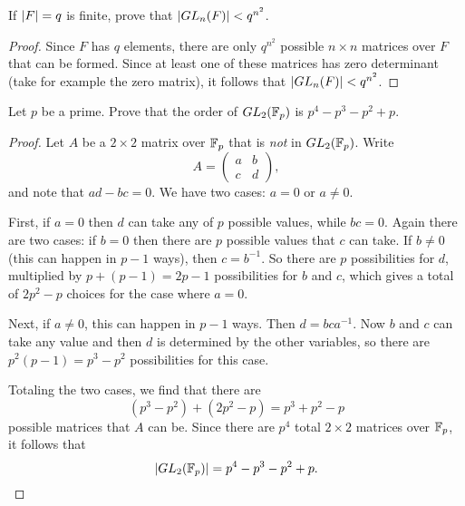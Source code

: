  If $\lvert{F}\rvert = q$ is finite, prove that
$\lvert{GL_n(F)}\rvert < q^{n^2}$.
\begin{proof}
  Since $F$ has $q$ elements, there are only $q^{n^2}$ possible
  $n\times n$ matrices over $F$ that can be formed. Since at least one
  of these matrices has zero determinant (take for example the zero
  matrix), it follows that $\lvert{GL_n(F)}\rvert < q^{n^2}$.
\end{proof}

 Let $p$ be a prime. Prove that the order of $GL_2(\mathbb{F}_p)$ is
$p^4 - p^3 - p^2 + p$.
\begin{proof}
  Let $A$ be a $2\times2$ matrix over $\mathbb{F}_p$ that is {\em not} in
  $GL_2(\mathbb{F}_p)$. Write
  \begin{equation*}
    A =
    \begin{pmatrix}
      a & b \\
      c & d
    \end{pmatrix},
  \end{equation*}
  and note that $ad - bc = 0$. We have two cases: $a = 0$ or
  $a\neq0$.

  First, if $a = 0$ then $d$ can take any of $p$ possible values,
  while $bc = 0$. Again there are two cases: if $b = 0$ then there are
  $p$ possible values that $c$ can take. If $b \neq 0$ (this can
  happen in $p-1$ ways), then $c = b^{-1}$. So there are $p$
  possibilities for $d$, multiplied by $p + (p - 1) = 2p - 1$
  possibilities for $b$ and $c$, which gives a total of $2p^2 - p$
  choices for the case where $a = 0$.

  Next, if $a \neq 0$, this can happen in $p - 1$ ways. Then
  $d = bca^{-1}$. Now $b$ and $c$ can take any value and then $d$ is
  determined by the other variables, so there are
  $p^2(p-1) = p^3 - p^2$ possibilities for this case.

  Totaling the two cases, we find that there are
  \begin{equation*}
    (p^3 - p^2) + (2p^2 - p) = p^3 + p^2 - p
  \end{equation*}
  possible matrices that $A$ can be. Since there are $p^4$ total
  $2\times2$ matrices over $\mathbb{F}_p$, it follows that
  \begin{equation*}
    \lvert{GL_2(\mathbb{F}_p)}\rvert = p^4 - p^3 - p^2 + p. \qedhere
  \end{equation*}
\end{proof}
